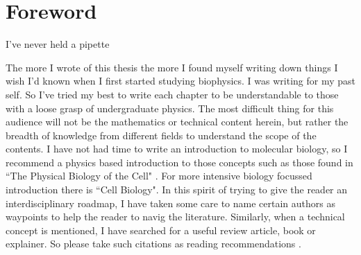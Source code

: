 \chapter*{Foreword}
\label{chap:foreword}
\begin{chapquote} {}
I've never held a pipette
\end{chapquote}

The more I wrote of this thesis the more I found myself writing down things I wish I'd known when I first started studying biophysics. I was writing for my past self. So I've tried my best to write each chapter to be understandable to those with a loose grasp of undergraduate physics. The most difficult thing for this audience will not be the mathematics or technical content herein, but rather the breadth of knowledge from different fields to understand the scope of the contents. I have not had time to write an introduction to molecular biology, so I recommend a physics based introduction to those concepts such as those found in ``The Physical Biology of the Cell" \cite{phillips2012}. For more intensive biology focussed introduction there is ``Cell Biology"\cite{pollard2016}. In this spirit of trying to give the reader an interdisciplinary roadmap, I have taken some care to name certain authors as waypoints to help the reader to navig the literature. Similarly, when a technical concept is mentioned, I have searched for a useful review article, book or explainer. So please take such citations as reading recommendations \cite{dawkins1989, hofstadter1999}.

